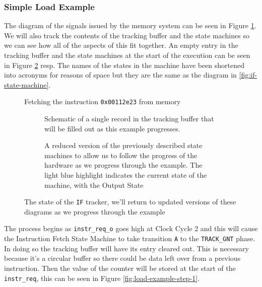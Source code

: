 \subsubsection{Simple Load Example}

The diagram of the signals issued by the memory system can be seen in Figure \ref{fig:simple-load-signal-diagram}. We will also track the contents of the tracking buffer and the state machines so we can see how all of the aspects of this fit together. An empty entry in the tracking buffer and the state machines at the start of the execution can be seen in Figure \ref{fig:load-example-starting-state} resp. The names of the states in the machine have been shortened into acronyms for reasons of space but they are the same as the diagram in \ref{fig:if-state-machine}. 

\begin{figure}[htbp]
		
		\caption{Fetching the instruction \texttt{0x00112e23} from memory}
		\label{fig:simple-load-signal-diagram}
\end{figure}

\begin{figure}[htbp]
	\begin{subfigure}{\linewidth}
		
		\caption{Schematic of a single record in the tracking buffer that will be filled out as this example progresses.}
	\end{subfigure}
	\begin{subfigure}{\linewidth}
		
		\caption{A reduced version of the previously described state machines to allow us to follow the progress of the hardware as we progress through the example. The light blue highlight indicates the current state of the machine, with the Output State}
	\end{subfigure}
\caption{The state of the \texttt{IF} tracker, we'll return to updated versions of these diagrams as we progress through the example}
\label{fig:load-example-starting-state}
\end{figure}

The process begins as \texttt{instr\_req\_o} goes high at Clock Cycle 2 and this will cause the Instruction Fetch State Machine to take transition \texttt{A} to the \texttt{TRACK\_GNT} phase. In doing so the tracking buffer will have its entry cleared out. This is necessary because it's a circular buffer so there could be data left over from a previous instruction. Then the value of the counter will be stored at the start of the \texttt{instr\_req}, this can be seen in Figure \ref{fig:load-example-step-1}. 

